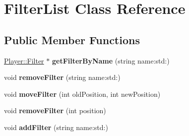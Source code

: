 \hypertarget{classPlayer_1_1FilterList}{}\section{Filter\+List Class Reference}
\label{classPlayer_1_1FilterList}
\subsection*{Public Member Functions}
\begin{DoxyCompactItemize}
\item 
\hypertarget{classPlayer_1_1FilterList_a4b7ba84059f85d67bc00a7617ab27e61}{}\hyperlink{classPlayer_1_1Filter}{Player\+::\+Filter} $\ast$ {\bfseries get\+Filter\+By\+Name} (string name\+:std\+:)\label{classPlayer_1_1FilterList_a4b7ba84059f85d67bc00a7617ab27e61}

\item 
\hypertarget{classPlayer_1_1FilterList_aa4b065915c41845aa7c58528dfcb1665}{}void {\bfseries remove\+Filter} (string name\+:std\+:)\label{classPlayer_1_1FilterList_aa4b065915c41845aa7c58528dfcb1665}

\item 
\hypertarget{classPlayer_1_1FilterList_a13c4ca4bd21b65ab2e2f01556338d095}{}void {\bfseries move\+Filter} (int old\+Position, int new\+Position)\label{classPlayer_1_1FilterList_a13c4ca4bd21b65ab2e2f01556338d095}

\item 
\hypertarget{classPlayer_1_1FilterList_a3cd55a8f60d5021235199170937644c5}{}void {\bfseries remove\+Filter} (int position)\label{classPlayer_1_1FilterList_a3cd55a8f60d5021235199170937644c5}

\item 
\hypertarget{classPlayer_1_1FilterList_a0fd61eb6483e3c34ed6deeef3f5951e1}{}void {\bfseries add\+Filter} (string name\+:std\+:)\label{classPlayer_1_1FilterList_a0fd61eb6483e3c34ed6deeef3f5951e1}

\end{DoxyCompactItemize}
